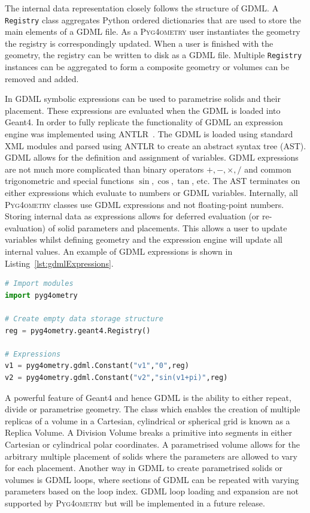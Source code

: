 \documentclass[final,5p,times,twocolumn]{elsarticle}
\newcommand{\PYGEOMETRY}{\textsc{Pyg4ometry}}
\begin{document}
The internal data representation closely follows the structure of GDML. A \verb|Registry| class aggregates Python ordered dictionaries that are  used to store the main 
elements of a GDML file. As a \PYGEOMETRY{} user instantiates the geometry the registry is correspondingly updated. When a user is finished with the geometry, the registry 
can be written to disk as a GDML file. Multiple \verb|Registry| instances can be aggregated to form a composite geometry or volumes can be removed and added. 

In GDML symbolic expressions can be used to parametrise solids and their placement. These expressions are evaluated when the GDML is loaded into Geant4. 
In order to fully replicate the functionality of GDML an expression engine was implemented using ANTLR~\cite{10.5555/2501720}. The GDML is loaded using 
standard XML modules and parsed using ANTLR to create an abstract syntax tree (AST).  GDML allows for the definition 
and assignment of variables. GDML expressions are not much more complicated than binary operators $+, -, \times, /$ and common trigonometric and special 
functions $\sin, \cos, \tan$, etc. The AST terminates on either expressions which evaluate to numbers or GDML variables. Internally, all \PYGEOMETRY{} 
classes use GDML expressions and not floating-point numbers. Storing internal data as expressions allows for deferred evaluation (or re-evaluation) of 
solid parameters and  placements. This allows a user to update variables whilst defining geometry and the expression engine will update all internal values. 
An example of GDML expressions is shown in Listing~\ref{lst:gdmlExpressions}.

\begin{lstlisting}[caption={A simple Python script using \PYGEOMETRY{} to create GDML variables.},label={lst:gdmlExpressions}, language=Python]
# Import modules 
import pyg4ometry

# Create empty data storage structure
reg = pyg4ometry.geant4.Registry()

# Expressions 
v1 = pyg4ometry.gdml.Constant("v1","0",reg)
v2 = pyg4ometry.gdml.Constant("v2","sin(v1+pi)",reg)

\end{lstlisting}

 
A powerful feature of Geant4 and hence GDML is the ability to either repeat, divide or parametrise geometry. The class which enables the creation of 
multiple replicas of a volume in a Cartesian, cylindrical or spherical grid is known as a Replica Volume. A Division Volume breaks a primitive into segments 
in either Cartesian or cylindrical polar coordinates. A parametrised volume allows for the arbitrary multiple placement of solids where the parameters are 
allowed to vary for each placement.  Another way in GDML to create parametrised solids or volumes is GDML loops, where sections of GDML can be 
 repeated with varying parameters based on the loop index. GDML loop loading and expansion are not supported by \PYGEOMETRY{} but will be implemented in a 
future release.
  
\end{document}
